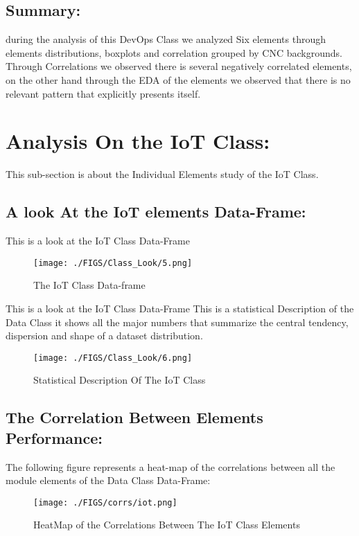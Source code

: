 \documentclass[12pt]{extreport}
\begin{document}
\subsection{Summary:}
during the analysis of this DevOps Class we analyzed Six elements through elements distributions, boxplots and correlation grouped by CNC backgrounds. Through Correlations we observed there is several negatively correlated elements, on the other hand through the EDA of the elements we observed that there is no relevant pattern that explicitly presents itself.




\section{Analysis On the IoT  Class:}

This sub-section is about the Individual Elements study of the IoT Class.
 
\subsection{A look At the IoT elements Data-Frame:}

This is a look at the IoT Class Data-Frame

\begin{figure}[H]
	\centering
	\texttt{[image: ./FIGS/Class\_Look/5.png]}
	\caption{The IoT Class Data-frame}	
	\label{fig:27}
\end{figure}


This is a look at the IoT Class Data-Frame
This is a statistical Description of the Data Class it shows all the major numbers that summarize the central tendency, dispersion and shape of a dataset distribution.

\begin{figure}[H]
	\centering
	\texttt{[image: ./FIGS/Class\_Look/6.png]}
	\caption{Statistical Description Of The IoT Class}
	\label{fig:28}
\end{figure}

\subsection{The Correlation Between Elements Performance:}

The following figure represents a heat-map of the correlations between all the module elements of the Data Class Data-Frame:


\begin{figure}[H]
	\centering
	\texttt{[image: ./FIGS/corrs/iot.png]}
	\caption{HeatMap of the Correlations Between The IoT Class Elements}
	\label{fig:29}
\end{figure}
\end{document}
